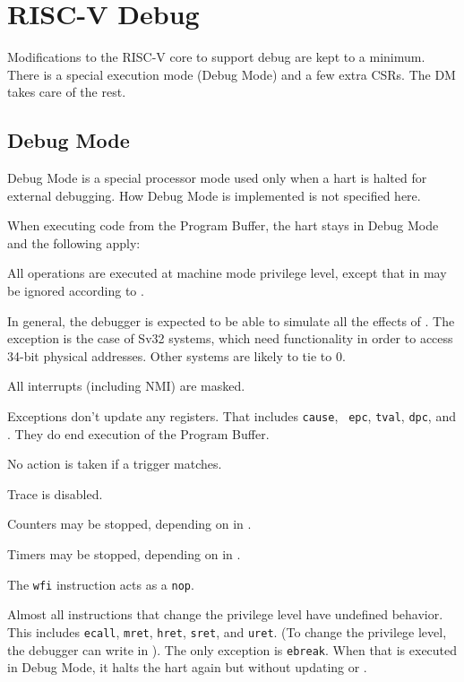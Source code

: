 \chapter{RISC-V Debug}
\label{sec:core_debug}

Modifications to the RISC-V core to support debug are kept to a minimum.  There
is a special execution mode (Debug Mode) and a few extra CSRs. The DM takes care
of the rest.

\section{Debug Mode} \label{debugmode}

Debug Mode is a special processor mode used only when a hart is halted for
external debugging. How Debug Mode is implemented is not specified here.

\begin{steps}{When executing code from the Program Buffer, the hart stays
    in Debug Mode and the following apply:}
\item All operations are executed at machine mode privilege level, except that
    \Fmprv in \Rmstatus may be ignored according to \Fmprven.
    \begin{commentary}
      In general, the debugger is expected to be able to simulate all the effects of \Fmprv.
      The exception is the case of Sv32 systems, which need \Fmprv functionality in order to access
      34-bit physical addresses. Other systems are likely to tie \Fmprven to 0.
    \end{commentary}
\item All interrupts (including NMI) are masked.
\item Exceptions don't update any registers.  That includes {\tt cause}, {\tt
    epc}, {\tt tval}, {\tt dpc}, and \Rmstatus. They do end execution of the
    Program Buffer.
\item No action is taken if a trigger matches.
\item Trace is disabled.
\item Counters may be stopped, depending on \Fstopcount in \Rdcsr.
\item Timers may be stopped, depending on \Fstoptime in \Rdcsr.
\item The {\tt wfi} instruction acts as a {\tt nop}.
\item Almost all instructions that change the privilege level have undefined
    behavior.  This includes {\tt ecall}, {\tt mret}, {\tt hret}, {\tt sret},
    and {\tt uret}.  (To change the privilege level, the debugger can write
    \Fprv in \Rdcsr). The only exception is {\tt ebreak}. When that is executed
    in Debug Mode, it halts the hart again but without updating \Rdpc or \Rdcsr.
\end{steps}

